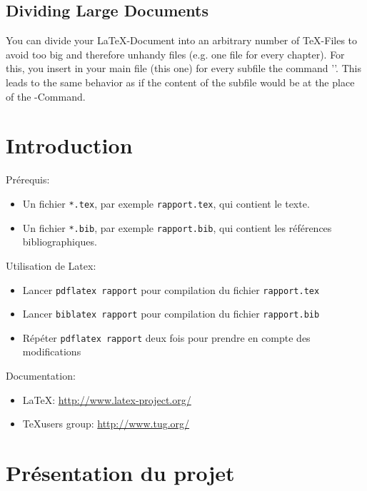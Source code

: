 \documentclass{article}
\begin{document}
{\subsection{Dividing Large Documents}
\label{dividing}
You can divide your \LaTeX-Document into an arbitrary number of \TeX-Files
to avoid too big and therefore unhandy files (e.g. one file for every chapter).
For this, you insert in your main file (this one) for every subfile
the command '\verb##'. This leads to the same behavior
as if the content of the subfile would be at the place of the
\verb##-Command.


\appendix
\section{Introduction}\label{sec:intro}

Prérequis:
\begin{itemize}
\item Un fichier \texttt{*.tex}, par exemple \texttt{rapport.tex}, qui
  contient le texte.
\item Un fichier \texttt{*.bib}, par exemple \texttt{rapport.bib}, qui
  contient les références bibliographiques.
\end{itemize}

Utilisation de Latex:
\begin{itemize}
\item Lancer \texttt{pdflatex rapport} pour compilation du fichier
  \texttt{rapport.tex}
\item Lancer \texttt{biblatex rapport} pour compilation du fichier
  \texttt{rapport.bib}
\item Répéter \texttt{pdflatex rapport} deux fois pour prendre en
  compte des modifications
\end{itemize}

Documentation:
\begin{itemize}
\item \LaTeX: \url{http://www.latex-project.org/}
\item \TeX users group: \url{http://www.tug.org/}
\end{itemize}


\section{Présentation du projet}

}
\end{document}
